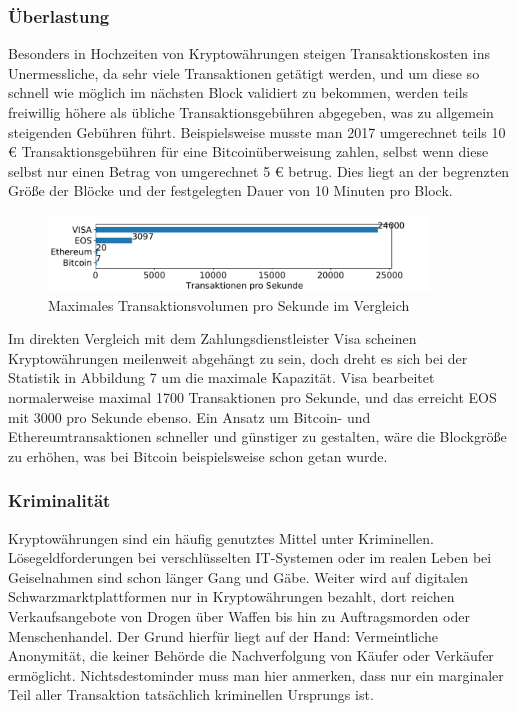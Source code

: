 \documentclass[12pt,oneside]{article}
\begin{document}
\subsubsection{Überlastung}

Besonders in Hochzeiten von Kryptowährungen steigen Transaktionskosten ins Unermessliche, da sehr viele Transaktionen getätigt werden, und um diese so schnell wie möglich im nächsten Block validiert zu bekommen, werden teils freiwillig höhere als übliche Transaktionsgebühren abgegeben, was zu allgemein steigenden Gebühren führt. Beispielsweise musste man 2017 umgerechnet teils 10 € Transaktionsgebühren für eine Bitcoinüberweisung zahlen, selbst wenn diese selbst nur einen Betrag von umgerechnet 5 € betrug. Dies liegt an der begrenzten Größe der Blöcke und der festgelegten Dauer von 10 Minuten pro Block. 


\begin{figure}[h]
\centering
\includegraphics[width=0.9\textwidth]{./images/transactions.pdf}
\caption{Maximales Transaktionsvolumen pro Sekunde im Vergleich \cite{rosenberg2019}}
\centering
\end{figure}

Im direkten Vergleich mit dem Zahlungsdienstleister Visa scheinen Kryptowährungen meilenweit abgehängt zu sein, doch dreht es sich bei der Statistik in Abbildung 7 um die maximale Kapazität. Visa bearbeitet normalerweise maximal 1700 Transaktionen pro Sekunde, und das erreicht EOS mit 3000 pro Sekunde ebenso. Ein Ansatz um Bitcoin- und Ethereumtransaktionen schneller und günstiger zu gestalten, wäre die Blockgröße zu erhöhen, was bei Bitcoin beispielsweise schon getan wurde.\cite{rosenberg2019}

\subsubsection{Kriminalität}

Kryptowährungen sind ein häufig genutztes Mittel unter Kriminellen. Lösegeldforderungen bei verschlüsselten IT-Systemen oder im realen Leben bei Geiselnahmen sind schon länger Gang und Gäbe. Weiter wird auf digitalen Schwarzmarktplattformen nur in Kryptowährungen bezahlt, dort reichen Verkaufsangebote von Drogen über Waffen bis hin zu Auftragsmorden oder Menschenhandel. Der Grund hierfür liegt auf der Hand: Vermeintliche Anonymität, die keiner Behörde die Nachverfolgung von Käufer oder Verkäufer ermöglicht. Nichtsdestominder muss man hier anmerken, dass nur ein marginaler Teil aller Transaktion tatsächlich kriminellen Ursprungs ist.
\end{document}
